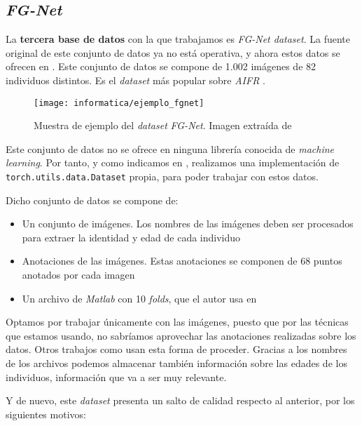 \subsection{\textit{FG-Net}} \label{isec:fgnet}

La \textbf{tercera base de datos} con la que trabajamos es \textit{FG-Net dataset}. La fuente original de este conjunto de datos ya no está operativa, y ahora estos datos se ofrecen en \cite{informatica:fgnet_dataset}. Este conjunto de datos se compone de 1.002 imágenes de 82 individuos distintos. Es el \textit{dataset} más popular sobre \textit{AIFR} \cite{informatica:best_fgnet_model}.

\begin{figure}[H]
    \centering
    \texttt{[image: informatica/ejemplo\_fgnet]}
    \caption{Muestra de ejemplo del \textit{dataset} \textit{FG-Net}. Imagen extraída de \cite{informatica:fg_net_papers_with_code}}
\end{figure}

Este conjunto de datos no se ofrece en ninguna librería conocida de \textit{machine learning}. Por tanto, y como indicamos en , realizamos una implementación de \lstinline{torch.utils.data.Dataset} propia, para poder trabajar con estos datos.

Dicho conjunto de datos se compone de:

\begin{itemize}
    \item Un conjunto de imágenes. Los nombres de las imágenes deben ser procesados para extraer la identidad y edad de cada individuo
    \item Anotaciones de las imágenes. Estas anotaciones se componen de 68 puntos anotados por cada imagen
    \item Un archivo de \textit{Matlab} con 10 \textit{folds}, que el autor usa en \cite{informatica:yanweifu_work}
\end{itemize}

Optamos por trabajar únicamente con las imágenes, puesto que por las técnicas que estamos usando, no sabríamos aprovechar las anotaciones realizadas sobre los datos. Otros trabajos como \cite{informatica:facenet} usan esta forma de proceder. Gracias a los nombres de los archivos podemos almacenar también información sobre las edades de los individuos, información que va a ser muy relevante.

Y de nuevo, este \textit{dataset} presenta un salto de calidad respecto al anterior, por los siguientes motivos:

